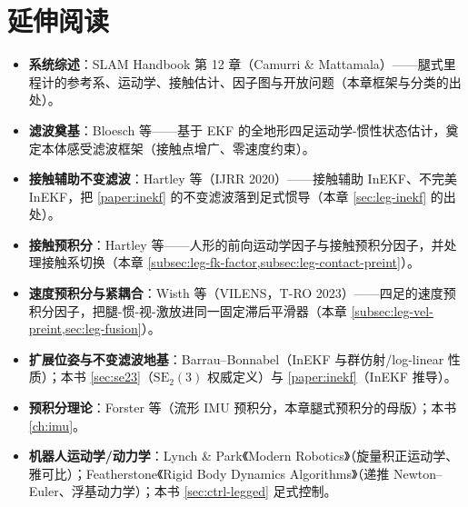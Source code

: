 \section*{延伸阅读}
\begin{itemize}
  \item \textbf{系统综述}：SLAM Handbook\cite{carlone2026handbook} 第 12 章（Camurri \& Mattamala）——腿式里程计的参考系、运动学、接触估计、因子图与开放问题（本章框架与分类的出处）。
  \item \textbf{滤波奠基}：Bloesch 等\cite{bloesch2013state}——基于 EKF 的全地形四足运动学-惯性状态估计，奠定本体感受滤波框架（接触点增广、零速度约束）。
  \item \textbf{接触辅助不变滤波}：Hartley 等\cite{hartley2020contact}（IJRR 2020）——接触辅助 InEKF、不完美 InEKF，把 \cref{paper:inekf} 的不变滤波落到足式惯导（本章 \cref{sec:leg-inekf} 的出处）。
  \item \textbf{接触预积分}：Hartley 等\cite{hartley2018legged}——人形的前向运动学因子与接触预积分因子，并处理接触系切换（本章 \cref{subsec:leg-fk-factor,subsec:leg-contact-preint}）。
  \item \textbf{速度预积分与紧耦合}：Wisth 等\cite{wisth2023vilens}（VILENS，T-RO 2023）——四足的速度预积分因子，把腿-惯-视-激放进同一固定滞后平滑器（本章 \cref{subsec:leg-vel-preint,sec:leg-fusion}）。
  \item \textbf{扩展位姿与不变滤波地基}：Barrau--Bonnabel\cite{barrau2017invariant}（InEKF 与群仿射/log-linear 性质）；本书 \cref{sec:se23}（$\mathrm{SE}_2(3)$ 权威定义）与 \cref{paper:inekf}（InEKF 推导）。
  \item \textbf{预积分理论}：Forster 等\cite{forster2017preintegration}（流形 IMU 预积分，本章腿式预积分的母版）；本书 \cref{ch:imu}。
  \item \textbf{机器人运动学/动力学}：Lynch \& Park《Modern Robotics》\cite{lynch2017modern}（旋量积正运动学、雅可比）；Featherstone《Rigid Body Dynamics Algorithms》\cite{featherstone2008rigid}（递推 Newton--Euler、浮基动力学）；本书 \cref{sec:ctrl-legged} 足式控制。
\end{itemize}

